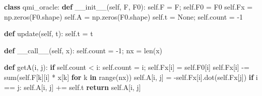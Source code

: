 \documentclass[10pt,ignorenonframetext,serif,onlymath]{beamer}
\newenvironment{Shaded}{}{}
\newcommand{\BuiltInTok}[1]{#1}
\newcommand{\ControlFlowTok}[1]{\textcolor[rgb]{0.00,0.44,0.13}{\textbf{#1}}}
\newcommand{\DecValTok}[1]{\textcolor[rgb]{0.25,0.63,0.44}{#1}}
\newcommand{\FunctionTok}[1]{\textcolor[rgb]{0.02,0.16,0.49}{#1}}
\newcommand{\KeywordTok}[1]{\textcolor[rgb]{0.00,0.44,0.13}{\textbf{#1}}}
\newcommand{\NormalTok}[1]{#1}
\newcommand{\OperatorTok}[1]{\textcolor[rgb]{0.40,0.40,0.40}{#1}}
\newcommand{\VariableTok}[1]{\textcolor[rgb]{0.10,0.09,0.49}{#1}}
\begin{document}
\begin{frame}[fragile]

\begin{Shaded}
\begin{Highlighting}[]
\KeywordTok{class}\NormalTok{ qmi_oracle:}
    \KeywordTok{def} \FunctionTok{__init__}\NormalTok{(}\VariableTok{self}\NormalTok{, F, F0):}
        \VariableTok{self}\NormalTok{.F }\OperatorTok{=}\NormalTok{ F}\OperatorTok{;} \VariableTok{self}\NormalTok{.F0 }\OperatorTok{=}\NormalTok{ F0}
        \VariableTok{self}\NormalTok{.Fx }\OperatorTok{=}\NormalTok{ np.zeros(F0.shape)}
        \VariableTok{self}\NormalTok{.A }\OperatorTok{=}\NormalTok{ np.zeros(F0.shape)}
        \VariableTok{self}\NormalTok{.t }\OperatorTok{=} \VariableTok{None}\OperatorTok{;} \VariableTok{self}\NormalTok{.count }\OperatorTok{=} \DecValTok{-1}

    \KeywordTok{def}\NormalTok{ update(}\VariableTok{self}\NormalTok{, t): }\VariableTok{self}\NormalTok{.t }\OperatorTok{=}\NormalTok{ t}

    \KeywordTok{def} \FunctionTok{__call__}\NormalTok{(}\VariableTok{self}\NormalTok{, x):}
        \VariableTok{self}\NormalTok{.count }\OperatorTok{=} \DecValTok{-1}\OperatorTok{;}\NormalTok{ nx }\OperatorTok{=} \BuiltInTok{len}\NormalTok{(x)}

        \KeywordTok{def}\NormalTok{ getA(i, j):}
            \ControlFlowTok{if} \VariableTok{self}\NormalTok{.count }\OperatorTok{<}\NormalTok{ i:}
                \VariableTok{self}\NormalTok{.count }\OperatorTok{=}\NormalTok{ i}\OperatorTok{;} \VariableTok{self}\NormalTok{.Fx[i] }\OperatorTok{=} \VariableTok{self}\NormalTok{.F0[i]}
                \VariableTok{self}\NormalTok{.Fx[i] }\OperatorTok{-=} \BuiltInTok{sum}\NormalTok{(}\VariableTok{self}\NormalTok{.F[k][i] }\OperatorTok{*}\NormalTok{ x[k]}
                                  \ControlFlowTok{for}\NormalTok{ k }\KeywordTok{in} \BuiltInTok{range}\NormalTok{(nx))}
            \VariableTok{self}\NormalTok{.A[i, j] }\OperatorTok{=} \OperatorTok{-}\VariableTok{self}\NormalTok{.Fx[i].dot(}\VariableTok{self}\NormalTok{.Fx[j])}
            \ControlFlowTok{if}\NormalTok{ i }\OperatorTok{==}\NormalTok{ j: }\VariableTok{self}\NormalTok{.A[i, j] }\OperatorTok{+=} \VariableTok{self}\NormalTok{.t}
            \ControlFlowTok{return} \VariableTok{self}\NormalTok{.A[i, j]}


\end{Highlighting}
\end{Shaded}
\end{frame}
\end{document}
